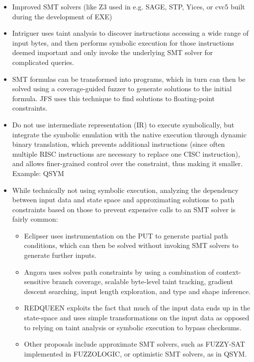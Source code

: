 \documentclass{article}
\begin{document}
\begin{multicols}{2}
\begin{itemize}
        \item Improved SMT solvers (like Z3\cite{Z3} used in e.g. SAGE\cite{SAGE}, STP\cite{STP}, Yices\cite{Yices}, or cvc5\cite{CVC5} built during the development of EXE\cite{EXE})
        \item Intriguer\cite{Intriguer} uses taint analysis to discover instructions accessing a wide range of input bytes, and then performs symbolic execution for those instructions deemed important and only invoke the underlying SMT solver for complicated queries.
        \item SMT formulas can be transformed into programs, which in turn can then be solved using a coverage-guided fuzzer to generate solutions to the initial formula. JFS\cite{JFS} uses this technique to find solutions to floating-point constraints.
        \item Do not use intermediate representation (IR) to execute symbolically, but integrate the symbolic emulation with the native execution through dynamic binary translation, which prevents additional instructions (since often multiple RISC instructions are necessary to replace one CISC instruction), and allows finer-grained control over the constraint, thus making it smaller. Example: QSYM\cite{QSYM}
        \item While technically not using symbolic execution, analyzing the dependency between input data and state space and approximating solutions to path constraints based on those to prevent expensive calls to an SMT solver is fairly common\cite{WEIZZ}:
              \begin{itemize}
                  \item Eclipser\cite{Eclipser} uses instrumentation on the PUT to generate partial path conditions, which can then be solved without invoking SMT solvers to generate further inputs.
                  \item Angora\cite{Angora} uses solves path constraints by using a combination of context-sensitive branch coverage, scalable byte-level taint tracking, gradient descent searching, input length exploration, and type and shape inference.
                  \item REDQUEEN\cite{REDQUEEN} exploits the fact that much of the input data ends up in the state-space and uses simple transformations on the input data as opposed to relying on taint analysis or symbolic execution to bypass checksums.
                  \item Other proposals include approximate SMT solvers, such as FUZZY-SAT implemented in FUZZOLOGIC\cite{FUZZOLIC}, or optimistic SMT solvers, as in QSYM\cite{QSYM}.
              \end{itemize}
    \end{itemize}


\end{multicols}
\end{document}
